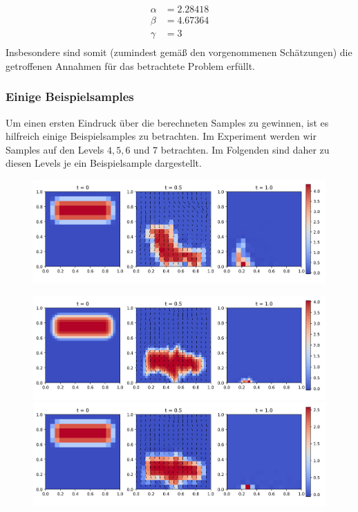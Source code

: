 \begin{align*}
\alpha &=2.28418 \\
\beta &=4.67364 \\
\gamma &=  3\\
\end{align*}
Insbesondere sind somit (zumindest gemäß den vorgenommenen Schätzungen) die getroffenen Annahmen für das betrachtete Problem erfüllt.
\subsubsection{Einige Beispielsamples}
Um einen ersten Eindruck über die berechneten Samples zu gewinnen, ist es hilfreich einige Beispielsamples zu betrachten. Im Experiment werden wir Samples auf den Levels $ 4,5,6 $ und $ 7 $ betrachten. Im Folgenden sind daher zu diesen Levels je ein Beispielsample dargestellt.
\begin{figure}[H]
	\centering
	\includegraphics[width=\textwidth]{plots/sample_4_1.png} 
\end{figure}
\begin{figure}[H]
	\centering
	\includegraphics[width=\textwidth]{plots/sample_5_1.png} 
	\includegraphics[width=\textwidth]{plots/sample_coarse_5_1.png} 
\end{figure}
